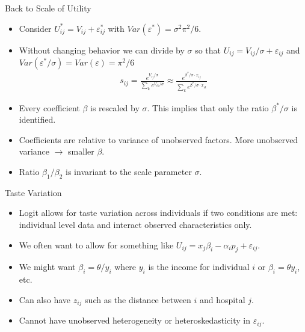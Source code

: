 \documentclass[xcolor=pdftex,dvipsnames,table,mathserif]{beamer}
\begin{document}
\begin{frame}{Back to Scale of Utility}
\begin{itemize}
\item Consider $U_{ij}^{*} = V_{ij} + \varepsilon_{ij}^{*}$ with $Var(\varepsilon^{*}) = \sigma^2 \pi^2/6$.
\item Without changing behavior we can divide by $\sigma$ so that $U_{ij} = V_{ij}/\sigma + \varepsilon_{ij}$ and $Var(\varepsilon^{*}/\sigma)=Var(\varepsilon) = \pi^2/6$
\begin{eqnarray*}
s_{ij} = \frac{e^{V_{ij}/\sigma}}{\sum_k e^{V_{ik}/\sigma}} \approx \frac{e^{\beta^{*}/\sigma \cdot x_{ij}}}{\sum_k e^{\beta^{*}/\sigma \cdot x_{ik}}}
\end{eqnarray*}
\item Every coefficient $\beta$ is rescaled by $\sigma$. This implies that only the ratio $\beta^{*}/\sigma$ is identified. 
\item Coefficients are relative to variance of unobserved factors. More unobserved variance $\longrightarrow$ smaller $\beta$.
\item Ratio $\beta_1/\beta_2$ is invariant to the scale parameter $\sigma$.
\end{itemize}
\end{frame}

\begin{frame}{Taste Variation}
\begin{itemize}
\item Logit allows for taste variation across individuals if two conditions are met: \alert{individual level data} and \alert{interact observed characteristics} only.
\item We often want to allow for something like $U_{ij} = x_{j} \beta_i - \alpha_i p_j + \varepsilon_{ij}$. 
\item We might want $\beta_i = \theta / y_i$ where $y_i$ is the income for individual $i$ or $\beta_i = \theta y_i$, etc.
\item Can also have $z_{ij}$ such as the distance between $i$ and hospital $j$.
\item Cannot have unobserved heterogeneity or heteroskedasticity in $\varepsilon_{ij}$.
\end{itemize}
\end{frame}
\end{document}
